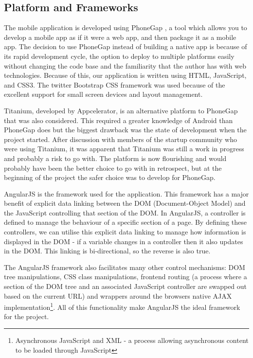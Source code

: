 \subsection{Platform and Frameworks}
The mobile application is developed using PhoneGap \cite{phonegap}, 
a tool which allows you to develop a mobile app as if it were
a web app, and then package it as a mobile app. The decision to use
PhoneGap instead of building a native app is because of its rapid
development cycle, the option to deploy to multiple platforms easily
without changing the code base and the familiarity that the author has
with web technologies. Because of this, our application is written
using HTML, JavaScript, and CSS3. The twitter Bootstrap CSS framework
\cite{bootstrap} was used because of the excellent support for small
screen devices and layout management. 

Titanium, developed by Appcelerator\cite{titanium}, is an alternative
platform to PhoneGap that was also considered. This required a greater
knowledge of Android than PhoneGap does but the biggest drawback was
the state of development when the project started. After discussion
with members of the startup community who were using Titanium, it was
apparent that Titanium was still a work in progress and probably a
risk to go with. The platform is now flourishing and would probably
have been the better choice to go with in retrospect, but at the
beginning of the project the safer choice was to develop for PhoneGap.

AngularJS\cite{angularjs} is the framework used for the
application. This framework has a major benefit of explicit data linking
between the DOM (Document-Object Model) and the JavaScript controlling
that section of the DOM. In AngularJS, a controller is defined to
manage the behaviour of a specific section of a page. By defining
these controllers, we can utilise this explicit data linking to manage
how information is displayed in the DOM - if a variable changes in a
controller then it also updates in the DOM. This linking is
bi-directional, so the reverse is also true. 

The AngularJS framework also facilitates many other control
mechanisms: DOM tree manipulations, CSS class manipulations, frontend
routing (a process where a section of the DOM tree and an associated
JavaScript controller are swapped out based on the current URL) and
wrappers around the browsers native AJAX implementation\footnote{Asynchronous
JavaScript and XML - a process allowing asynchronous content to be
loaded through JavaScript}. All of this
functionality make AngularJS the ideal framework for the project. 

